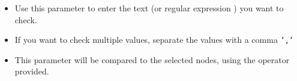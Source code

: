 
\begin{itemize}
\item Use this parameter to enter the text (or regular expression ) you want to check. 
\item If you want to check multiple values, separate the values with a comma {\tt ','}
\item This parameter will be compared to the selected nodes, using the operator provided.
\end{itemize}
